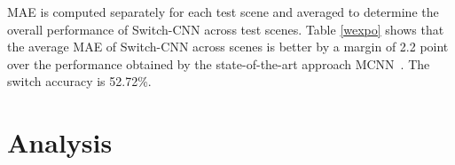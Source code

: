 \documentclass[10pt,twocolumn,letterpaper]{article}
\begin{document}
MAE is computed separately for each test scene and averaged to determine the overall performance of Switch-CNN across test scenes. Table \ref{wexpo} shows that the average MAE of Switch-CNN across scenes is better by a margin of 2.2 point over the performance obtained by the state-of-the-art approach MCNN~\cite{zhang2016single}. The switch accuracy is 52.72\%. %






\section{Analysis}


\begin{comment}
\subsection{Individual CNN Regressors Vs Switch-CNN}

Switch-CNN leverages multiple independent CNN regressors with different receptive fields that are capable of capturing the scale and perspective variations typical in a crowd scene. The structural differences and the resultant properties are accentuated by differential training.These regressors operate on different regions of the input
image based on the switch. Since each region is processed by the best
CNN regressor $R_k$, Switch-CNN should have better MAE performance than each of the individual regressors. We verify this claim by training each regressor $R_k$ independently. In Table \ref{comp2}, we compare the performance of individual CNN regressors with Switch-CNN. Here each of the individual regressors are trained on the full training data from Part A of Shanghaitech dataset. It is evident that all the 
CNN regressors $R_1$ through $R_3$, when applied to entire input image, have significantly high MAE than Switch-CNN. The higher MAE of the individual CNN regressor is credited to the inability of a single regressor to model the scale and perspective variations in the crowd scene. This results in the observed average count error of upto 80 points between $R_k$ and Switch-CNN.
\end{comment}
\end{document}
